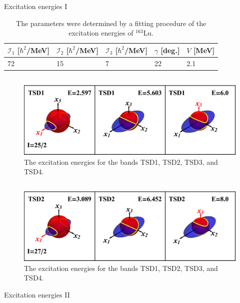 \documentclass{beamer}
\begin{document}
\begin{frame}{Excitation energies I}
    \begin{table}[h]
    \centering
  \begin{tabular}{lllll}
  \hline
$\mathcal{I}_1$ [$\hbar^2$/MeV] & $\mathcal{I}_2$ [$\hbar^2$/MeV]& $\mathcal{I}_3$ [$\hbar^2$/MeV] & $\gamma$ [deg.] & $V$ [MeV] \\
\hline
\hline
72              & 15              & 7               & 22       & 2.1
\end{tabular}
    \caption{The parameters were determined by a fitting procedure of the excitation energies of $^{163}$Lu.}
    \label{parameter_set}
\end{table}

\begin{columns} 
\begin{figure}
    \centering
    \includegraphics[scale=0.40]{figs/tsd1_spin1.eps}
    \caption{The excitation energies for the bands TSD1, TSD2, TSD3, and TSD4.}
    \label{tsd_bands}
\end{figure}
\end{columns}
\begin{figure}
    \centering
    \includegraphics[scale=0.40]{figs/tsd2_spin1.eps}
    \caption{The excitation energies for the bands TSD1, TSD2, TSD3, and TSD4.}
    \label{tsd_bands}
\end{figure}
\end{frame}

\begin{frame}{Excitation energies II}
    
\end{frame}
\end{document}
